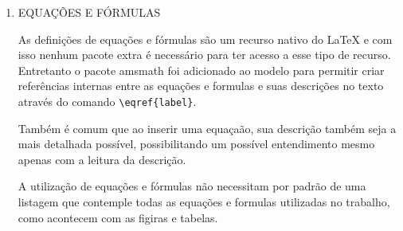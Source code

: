 \begin{enumerate}
	É possível com essa abordagem por exemplo, utilizar uma lista enumerada para apresentar ums listagem específica do seu trabalho, como por exemplo a lista de questões de pesquisa que o seu trabalho tenat responder:

	\begin{verbatim}
		\begin{enumerate}[label=\textbf{QP\arabic* -}]
			\item A dinâmica da execução do método de classificação FSP...?
			\item Quais estratégias de paralelização trazem melhores...?
			\item É possível realizar esse processo de paralelização ...?
		\end{enumerate}
	\end{verbatim}

	O que seria apresentado da seguinte forma:

	\begin{enumerate}[label=\textbf{QP\arabic* -}]
		\item A dinâmica da execução do método de classificação FSP...?
		\item Quais estratégias de paralelização trazem melhores...?
		\item É possível realizar esse processo de paralelização ...?
	\end{enumerate}
	
	O Apêndice C também apresenta um formulário, onde uma lista enumerada foi utilizada para realizar a formatação das suas questões.

	\item \MakeUppercase{Equações e fórmulas}

	As definições de equações e fórmulas são um recurso nativo do {\LaTeX} e com isso nenhum pacote extra é necessário para ter acesso a esse tipo de recurso. Entretanto o pacote amsmath \cite{amsmath_package} foi adicionado ao modelo para permitir criar referências internas entre as equações e formulas e suas descrições no texto através do comando \verb|\eqref{label}|.

	Também é comum que ao inserir uma equaçaão, sua descrição também seja a mais detalhada possível, possibilitando um possível entendimento mesmo apenas com a leitura da descrição.

	A utilização de equações e fórmulas não necessitam por padrão de uma listagem que contemple todas as equações e formulas utilizadas no trabalho, como acontecem com as figiras e tabelas.


\end{enumerate}
